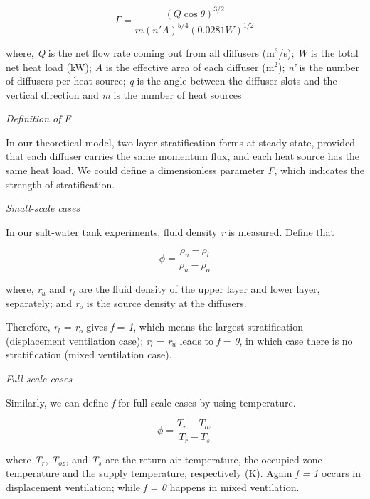 \begin{equation}
\Gamma  = \frac{{{{(Q\cos \theta )}^{3/2}}}}{{m{{(n'A)}^{5/4}}{{(0.0281W)}^{1/2}}}}
\end{equation}

where, \emph{Q} is the net flow rate coming out from all diffusers (m\(^{3}\)/s); \emph{W} is the total net heat load (kW); \emph{A} is the effective area of each diffuser (m\(^{2}\)); \emph{n'} is the number of diffusers per heat source; \emph{q} is the angle between the diffuser slots and the vertical direction and \emph{m} is the number of heat sources

\emph{Definition of} \emph{F}

In our theoretical model, two-layer stratification forms at steady state, provided that each diffuser carries the same momentum flux, and each heat source has the same heat load. We could define a dimensionless parameter \emph{F}, which indicates the strength of stratification.

\emph{Small-scale cases}

In our salt-water tank experiments, fluid density \emph{r} is measured. Define that

\begin{equation}
\phi  = \frac{{{\rho_u} - {\rho_l}}}{{{\rho_u} - {\rho_o}}}
\end{equation}

where, \emph{r\(_{u}\)} and \emph{r\(_{l}\)} are the fluid density of the upper layer and lower layer, separately; and \emph{r\(_{o}\)} is the source density at the diffusers.

Therefore, \emph{r\(_{l}\)} = \emph{r\(_{o}\)} gives \emph{f} = \emph{1}, which means the largest stratification (displacement ventilation case); \emph{r\(_{l}\)} = \emph{r\(_{u}\)} leads to \emph{f} = \emph{0}, in which case there is no stratification (mixed ventilation case).

\emph{Full-scale cases}

Similarly, we can define \emph{f} for full-scale cases by using temperature.

\begin{equation}
\phi  = \frac{{{T_r} - {T_{oz}}}}{{{T_r} - {T_s}}}
\end{equation}

where \emph{T\(_{r}\)}, \emph{T\(_{oz}\)}, and \emph{T\(_{s}\)} are the return air temperature, the occupied zone temperature and the supply temperature, respectively (K). Again \emph{f = 1} occurs in displacement ventilation; while \emph{f = 0} happens in mixed ventilation.

